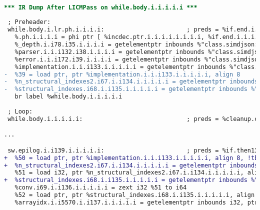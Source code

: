 \begin{lstlisting}[language=diff, caption={Diff between the code generated by LICM with and
without the \textit{align} attribute on the \textit{this} pointer}, label={lst:licm_diff}]

*** IR Dump After LICMPass on while.body.i.i.i.i.i ***
 
 ; Preheader:
 while.body.i.lr.ph.i.i.i.i:                       ; preds = %if.end.i.i.i.i.i, %if.end.while.body.i.lr.ph.i_crit_edge.i.i.i
   %.ph.i.i.i.i = phi ptr [ %incdec.ptr.i.i.i.i.i.i.i.i, %if.end.i.i.i.i.i ], [ %add.ptr.i.i.i.i.i.i, %if.end.while.body.i.lr.ph.i_crit_edge.i.i.i ]
   %_depth.i.i78.i35.i.i.i.i = getelementptr inbounds %"class.simdjson::fallback::ondemand::json_iterator", ptr %doc, i64 0, i32 4
   %parser.i.i.i132.i38.i.i.i.i = getelementptr inbounds %"class.simdjson::fallback::ondemand::json_iterator", ptr %doc, i64 0, i32 1
   %error.i.i.i172.i39.i.i.i.i = getelementptr inbounds %"class.simdjson::fallback::ondemand::json_iterator", ptr %doc, i64 0, i32 3
   %implementation.i.i.i133.i.i.i.i.i = getelementptr inbounds %"class.simdjson::fallback::ondemand::parser", ptr %this, i64 0, i32 1
-  %39 = load ptr, ptr %implementation.i.i.i133.i.i.i.i.i, align 8
-  %n_structural_indexes2.i67.i.i134.i.i.i.i.i = getelementptr inbounds %"class.simdjson::internal::dom_parser_implementation", ptr %39, i64 0, i32 1
-  %structural_indexes.i68.i.i135.i.i.i.i.i = getelementptr inbounds %"class.simdjson::internal::dom_parser_implementation", ptr %39, i64 0, i32 2
   br label %while.body.i.i.i.i.i
 
 ; Loop:
 while.body.i.i.i.i.i:                             ; preds = %cleanup.cont.i.i.i9.i.i, %while.body.i.lr.ph.i.i.i.i

...

 sw.epilog.i.i139.i.i.i.i.i:                       ; preds = %if.then13.i.i127.i.i.i.i.i, %if.end.i.i118.i.i.i.i.i, %if.end.i.i118.i.i.i.i.i, %if.end.i.i118.i.i.i.i.i, %if.end.i.i118.i.i.i.i.i
+  %50 = load ptr, ptr %implementation.i.i.i133.i.i.i.i.i, align 8, !tbaa !35, !noalias !77
+  %n_structural_indexes2.i67.i.i134.i.i.i.i.i = getelementptr inbounds %"class.simdjson::internal::dom_parser_implementation", ptr %50, i64 0, i32 1
   %51 = load i32, ptr %n_structural_indexes2.i67.i.i134.i.i.i.i.i, align 8, !tbaa !67, !noalias !77
+  %structural_indexes.i68.i.i135.i.i.i.i.i = getelementptr inbounds %"class.simdjson::internal::dom_parser_implementation", ptr %50, i64 0, i32 2
   %conv.i69.i.i136.i.i.i.i.i = zext i32 %51 to i64
   %52 = load ptr, ptr %structural_indexes.i68.i.i135.i.i.i.i.i, align 8, !tbaa !35, !noalias !77
   %arrayidx.i.i5570.i.i137.i.i.i.i.i = getelementptr inbounds i32, ptr %52, i64 %conv.i69.i.i136.i.i.i.i.i

\end{lstlisting}

